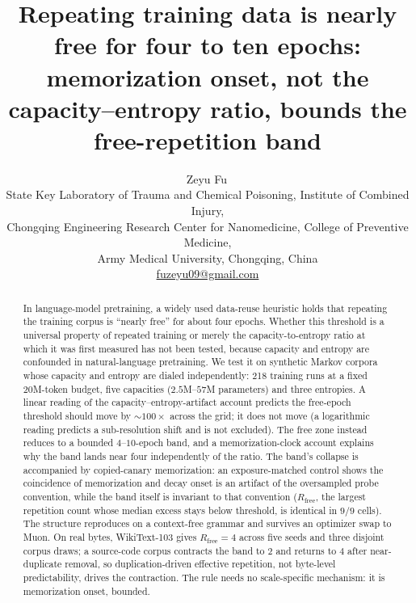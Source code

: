 \documentclass[11pt]{article}
\begin{document}
\title{Repeating training data is nearly free for four to ten epochs:
memorization onset, not the capacity--entropy ratio, bounds the free-repetition band}
\author{Zeyu Fu\,\\
State Key Laboratory of Trauma and Chemical Poisoning, Institute of Combined Injury,\\
Chongqing Engineering Research Center for Nanomedicine, College of Preventive Medicine,\\
Army Medical University, Chongqing, China\\
\href{mailto:fuzeyu09@gmail.com}{fuzeyu09@gmail.com}}
\date{}

\maketitle

\begin{abstract}
In language-model pretraining, a widely used data-reuse heuristic holds that repeating
the training corpus is ``nearly free'' for about four epochs. Whether this threshold
is a universal property of repeated training or merely the capacity-to-entropy ratio
at which it was first measured has not been tested, because capacity and entropy are
confounded in natural-language pretraining. We test it on synthetic Markov corpora
whose capacity and entropy are dialed independently: 218 training runs at a fixed
20M-token budget, five capacities ($2.5$M--$57$M parameters) and three entropies. A
linear reading of the capacity--entropy-artifact account predicts the free-epoch
threshold should move by ${\sim}100\times$ across the grid; it does not move (a
logarithmic reading predicts a sub-resolution shift and is not excluded). The free
zone instead reduces to a bounded $4$--$10$-epoch band, and a memorization-clock
account explains why the band lands near four independently of the ratio. The band's
collapse is accompanied by copied-canary memorization: an exposure-matched control
shows the coincidence of memorization and decay onset is an artifact of the
oversampled probe convention, while the band itself is invariant to that convention
($R_{\mathrm{free}}$, the largest repetition count whose median excess stays below
threshold, is identical in $9/9$ cells). The structure reproduces on a
context-free grammar and survives an optimizer swap to Muon. On real bytes,
WikiText-103 gives $R_{\mathrm{free}}{=}4$ across five seeds and three disjoint corpus
draws; a source-code corpus contracts the band to $2$ and returns to $4$ after
near-duplicate removal, so duplication-driven effective repetition, not byte-level
predictability, drives the contraction. The rule needs no scale-specific mechanism:
it is memorization onset, bounded.
\end{abstract}
\end{document}
